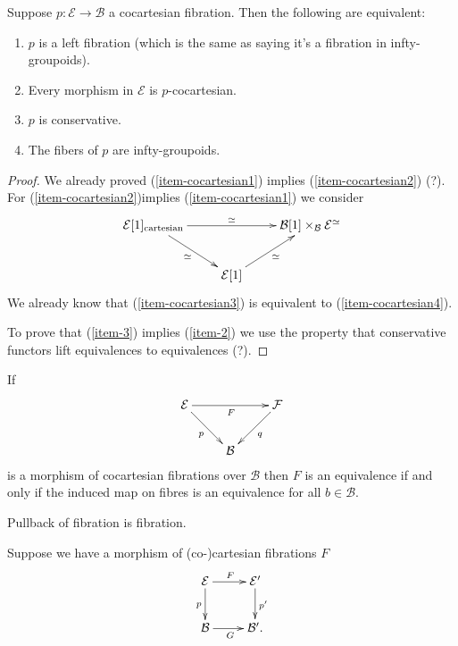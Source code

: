 \begin{lemma}
\label{lemma-cocar-fibra-equiv}
Suppose $p:\mathcal{E} \to \mathcal{B}$ a
cocartesian fibration.
Then the following are equivalent:
\begin{enumerate}
\item $p$ is a left fibration (which is the
same as saying it's
a fibration in infty-groupoids).
\label{item-cocartesian1}

\item Every morphism in $\mathcal{E}$ is
$p$-cocartesian.
\label{item-cocartesian2}

\item $p$ is conservative.
\label{item-cocartesian3}

\item The fibers of $p$ are
infty-groupoids.
\label{item-cocartesian4}
\end{enumerate}
\end{lemma}

\begin{proof}
We already proved (\ref{item-cocartesian1})
implies (\ref{item-cocartesian2})
(?). For (\ref{item-cocartesian2})implies
(\ref{item-cocartesian1}) we consider
$$
\xymatrix{
\mathcal{E}[1]_{\text{cartesian}}
\ar[rd]_{\simeq} \ar[rr]^{\simeq} &&
\mathcal{B}[1]\times_{\mathcal{B}}\mathcal{E}
^{\simeq}
\\
& \mathcal{E}[1]\ar[ur]_{\simeq}
}
$$
We already know that
(\ref{item-cocartesian3}) is equivalent to
(\ref{item-cocartesian4}).

To prove that (\ref{item-3}) implies
(\ref{item-2})
we use the property that conservative
functors
lift equivalences to equivalences (?).


\end{proof}

\begin{proposition}
\label{proposition-mophi-cocar-fibra-equiv}
If
$$
\xymatrix{
\mathcal{E} \ar[rd]_{p} \ar[rr]_{F} &&
\mathcal{F} \ar[dl]^{q} \\
& \mathcal{B}
}
$$
is a morphism of cocartesian fibrations over
$\mathcal{B}$
then $F$ is an equivalence if and only if the
induced
map on fibres is an equivalence for all $b
\in \mathcal{B}$.
\end{proposition}

\begin{proposition}
\label{proposition-3.5.15}
Pullback of fibration is fibration.
\end{proposition}

\begin{exercise}
\label{exercise-pullb-iff-equiv-fiber-inft}
Suppose we have a morphism of (co-)cartesian
fibrations $F$
$$
\xymatrix{
\mathcal{E}\ar[r]^{F}\ar[d]_{p}&\mathcal{E}
'\ar[d]^{p'}\\
\mathcal{B}\ar[r]_{G}&\mathcal{B}'.
}
$$
\end{exercise}

